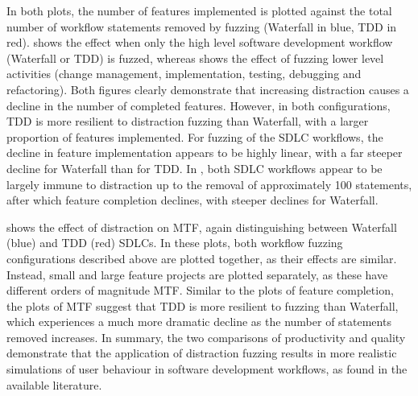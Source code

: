 \documentclass{llncs}
\begin{document}
%
In both plots, the number of features implemented is plotted against the total number of workflow statements removed by
fuzzing (Waterfall in blue, TDD in red).  shows the effect when only the high level
software development workflow (Waterfall or TDD) is fuzzed, whereas  shows the effect
of fuzzing lower level activities (change management, implementation, testing, debugging and refactoring). Both figures
clearly demonstrate that increasing distraction causes a decline in the number of completed features. However, in both
configurations, TDD is more resilient to distraction fuzzing than Waterfall, with a larger proportion of features
implemented. For fuzzing of the SDLC workflows, the decline in feature implementation appears to be highly linear, with
a far steeper decline for Waterfall than for TDD. In , both SDLC workflows appear to be
largely immune to distraction up to the removal of approximately 100 statements, after which feature completion
declines, with steeper declines for Waterfall.

 shows the effect of distraction on MTF, again distinguishing between Waterfall (blue) and TDD
(red) SDLCs.  In these plots, both workflow fuzzing configurations described above are plotted together, as their
effects are similar.  Instead, small and large feature projects are plotted separately, as these have different orders
of magnitude MTF.  Similar to the plots of feature completion, the plots of MTF suggest that TDD is more resilient to
fuzzing than Waterfall, which experiences a much more dramatic decline as the number of statements removed increases.
In summary, the two comparisons of productivity and quality demonstrate that the application of distraction fuzzing
results in more realistic simulations of user behaviour in software development workflows, as found in the available
literature.
\end{document}
